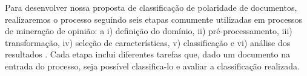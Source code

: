 

%
%


Para desenvolver nossa proposta de classificação de polaridade de documentos, realizaremos o processo seguindo seis etapas comumente utilizadas em processos de mineração de opinião: a i) definição do domínio, ii) pré-processamento, iii) transformação, iv) seleção de características, v) classificação e vi) análise dos resultados \cite{moraes2012document}. Cada etapa inclui diferentes tarefas que, dado um documento na entrada do processo, seja possível classifica-lo e avaliar a classificação realizada.

